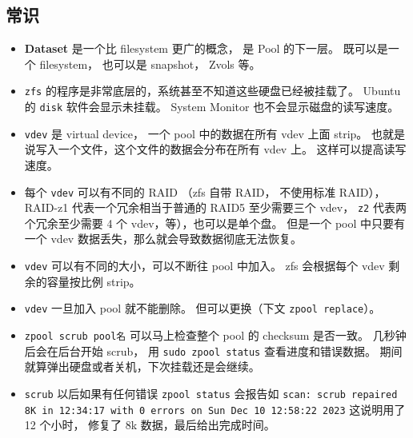 \subsection{常识}
\begin{itemize}
\item \textbf{Dataset} 是一个比 filesystem 更广的概念， 是 Pool 的下一层。 既可以是一个 filesystem， 也可以是 snapshot， Zvols 等。
\item \verb|zfs| 的程序是非常底层的，系统甚至不知道这些硬盘已经被挂载了。 Ubuntu 的 \verb|disk| 软件会显示未挂载。 System Monitor 也不会显示磁盘的读写速度。
\item \verb|vdev| 是 virtual device， 一个 pool 中的数据在所有 vdev 上面 strip。 也就是说写入一个文件，这个文件的数据会分布在所有 vdev 上。 这样可以提高读写速度。
\item 每个 \verb|vdev| 可以有不同的 RAID （zfs 自带 RAID， 不使用标准 RAID），RAID-z1 代表一个冗余相当于普通的 RAID5 至少需要三个 vdev， \verb|z2| 代表两个冗余至少需要 4 个 vdev，等），也可以是单个盘。 但是一个 pool 中只要有一个 vdev 数据丢失，那么就会导致数据彻底无法恢复。
\item \verb|vdev| 可以有不同的大小，可以不断往 pool 中加入。 zfs 会根据每个 vdev 剩余的容量按比例 strip。
\item \verb|vdev| 一旦加入 pool 就不能删除。 但可以更换（下文 \verb|zpool replace|）。
\item \verb|zpool scrub pool名| 可以马上检查整个 pool 的 checksum 是否一致。 几秒钟后会在后台开始 scrub， 用 \verb|sudo zpool status| 查看进度和错误数据。 期间就算弹出硬盘或者关机，下次挂载还是会继续。
\item \verb`scrub` 以后如果有任何错误 \verb`zpool status` 会报告如 \verb`scan: scrub repaired 8K in 12:34:17 with 0 errors on Sun Dec 10 12:58:22 2023` 这说明用了 12 个小时， 修复了 8k 数据，最后给出完成时间。
\end{itemize}

